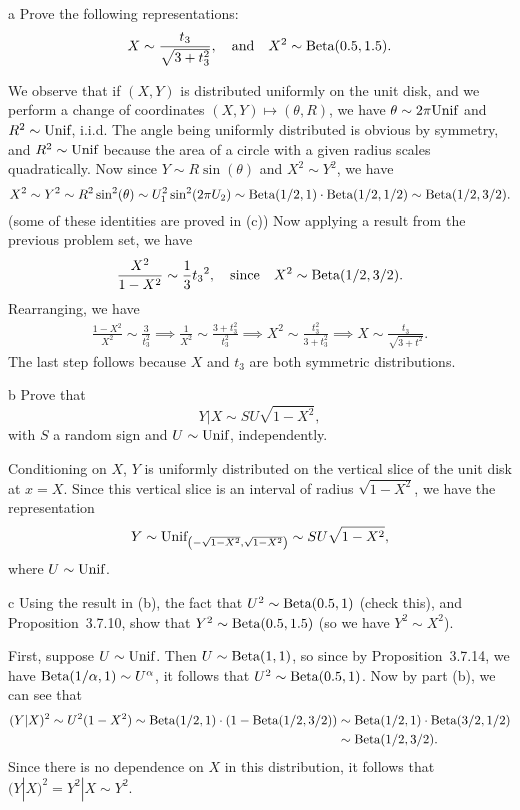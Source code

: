 \documentclass{pset}
\begin{document}
\begin{parts}
  \begin{part}{a}
    Prove the following representations:
    \[ X \sim \frac{t_3}{\sqrt{3+t_3^2}}, \quad\textrm{and}\quad X^2 \sim \textrm{Beta}(0.5,1.5).\]
  \end{part}

  We observe that if $(X,Y)$ is distributed uniformly on the unit disk, and we perform a change of coordinates $(X, Y) \mapsto (\theta, R)$, we have $\theta \sim 2\pi \textrm{Unif}$ and $R^2 \sim \textrm{Unif}$, i.i.d. The angle being uniformly distributed is obvious by symmetry, and $R^2 \sim \textrm{Unif}$ because the area of a circle with a given radius scales quadratically. Now since $Y\sim R\sin(\theta)$ and $X^2\sim Y^2$, we have
  \[
    X^2 \sim Y^2 \sim R^2 \sin^2(\theta) \sim U_1^2 \sin^2(2\pi U_2) \sim \textrm{Beta}(1/2, 1)\cdot \textrm{Beta}(1/2, 1/2) \sim \textrm{Beta}(1/2, 3/2).
  \]
  (some of these identities are proved in (c)) Now applying a result from the previous problem set, we have
  \[
    \frac{X^2}{1-X^2}\sim \frac{1}{3}{t_3}^2,\quad\textrm{since}\quad X^2\sim \textrm{Beta}(1/2, 3/2).
  \]
  Rearranging, we have
  \[
    \begin{aligned}
      \frac{1-X^2}{X^2} \sim \frac{3}{t_3^2} \implies \frac{1}{X^2} \sim \frac{3+t_3^2}{t_3^2} \implies X^2 \sim \frac{t_3^2}{3+ t_3^2} \implies X \sim \frac{t_3}{\sqrt{3+t^2}}.
    \end{aligned}
  \]
  The last step follows because $X$ and $t_3$ are both symmetric distributions.

  \begin{part}{b}
    Prove that 
    \[ Y|X \sim SU\sqrt{1-X^2},\]
    with $S$ a random sign and $U\sim \textrm{Unif}$, independently.
  \end{part}

  Conditioning on $X$, $Y$ is uniformly distributed on the vertical slice of the unit disk at $x= X$. Since this vertical slice is an interval of radius $\sqrt{1-X^2}$, we have the representation \[Y \sim \textrm{Unif}_{\left(-\sqrt{1-X^2}, \sqrt{1-X^2}\right)}\sim SU\sqrt{1-X^2},\] where $U\sim \textrm{Unif}$.

  \begin{part}{c}
    Using the result in (b), the fact that $U^2\sim \textrm{Beta}(0.5, 1)$ (check this), and Proposition~3.7.10, show that $Y^2 \sim \textrm{Beta}(0.5, 1.5)$ (so we have $Y^2 \sim X^2$).
  \end{part}

  First, suppose $U\sim \textrm{Unif}$. Then $U\sim \textrm{Beta}(1, 1)$, so since by Proposition~3.7.14, we have $\textrm{Beta}(1/\alpha, 1)\sim U^\alpha$, it follows that $U^2 \sim \textrm{Beta}(0.5, 1)$. Now by part (b), we can see that
  \[\begin{aligned}(Y|X)^2 \sim U^2(1-X^2) \sim \textrm{Beta}(1/2, 1)\cdot (1-\textrm{Beta}(1/2, 3/2)) &\sim \textrm{Beta}(1/2, 1)\cdot \textrm{Beta}(3/2, 1/2) \\
  &\sim \textrm{Beta}(1/2, 3/2).
  \end{aligned}\]
  Since there is no dependence on $X$ in this distribution, it follows that $(Y|X)^2 = Y^2|X \sim Y^2$.
\end{parts}
\end{document}
